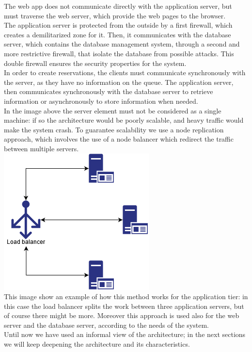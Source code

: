 The web app does not communicate directly with the application server, but must traverse the web server, which provide the web pages to the browser.\\
The application server is protected from the outside by a first firewall, which creates a demilitarized zone for it. Then, it communicates with the database server, which contains the database management system, through a second and more restrictive firewall, that isolate the database from possible attacks. This double firewall ensures the security properties for the system.\\
In order to create reservations, the clients must communicate synchronously with the server, as they have no information on the queue. The application server, then communicates synchronously with the database server to retrieve information or asynchronously to store information when needed.\\
In the image above the server element must not be considered as a single machine: if so the architecture would be poorly scalable, and heavy traffic would make the system crash. To guarantee scalability we use a node replication approach, which involves the use of a node balancer which redirect the traffic between multiple servers.\\
\includegraphics[scale=0.5]{Images/LoadBalancer.png}\\
This image show an example of how this method works for the application tier: in this case the load balancer splits the work between three application servers, but of course there might be more. Moreover this approach is used also for the web server and the database server, according to the needs of the system.\\
Until now we have used an informal view of the architecture; in the next sections we will keep deepening the architecture and its characteristics.\\
